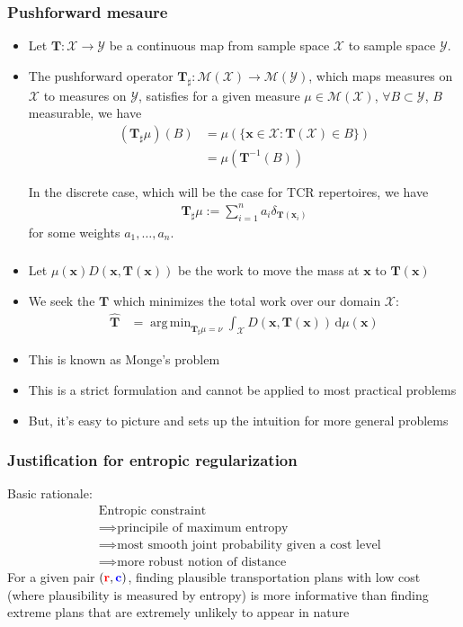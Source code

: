 \documentclass[mathserif,compress,xcolor={dvipsnames}]{beamer}
\newcommand*\ba{\[ \begin{aligned}}
\newcommand*\ea{\end{aligned} \]}
\newcommand*\estim[1]{\widehat{#1}}
\newcommand*\der{\text{d}}
\DeclareMathOperator*{\argmin}{arg\;min}
\renewcommand\;{\,}
\begin{document}
\begin{frame}\frametitle{Pushforward mesaure}
\begin{itemize}
\item
Let $\mathbf T : \mathcal X \to \mathcal Y$ be a continuous map from sample space $\mathcal X$ to sample space $\mathcal Y$.
\item
The pushforward operator $\mathbf T_\sharp : \mathcal M(\mathcal X) \to \mathcal M(\mathcal Y)$, which maps measures on $\mathcal X$ to measures on $\mathcal Y$, satisfies for a given measure $\mu \in \mathcal M(\mathcal X)$,
 $\forall B \subset \mathcal Y$, $B$ measurable, we have
\begin{align}
    \left(\mathbf T_\sharp \mu\right) (B) 
    & = \mu\left( \{ \mathbf x \in \mathcal X : \mathbf T(\mathcal X) \in B \} \right) \\
    & = \mu\left(\mathbf T^{-1}(B) \right)
\end{align}

In the discrete case, which will be the case for TCR repertoires, we have
\ba
    \mathbf T_\sharp \mu := \sum_{i=1}^n a_i \delta_{\mathbf T(\mathbf x_i)}
\ea
for some weights $a_1, \dotsc, a_n$. 
\end{itemize}
\end{frame}

\begin{frame}\frametitle{}
\begin{itemize}
\item
Let $\mu(\mathbf x) D(\mathbf x, \mathbf T(\mathbf x))$ be the work to move the mass at $\mathbf x$ to $\mathbf T(\mathbf x)$
\item
We seek the $\mathbf T$ which minimizes the total work over our domain $\mathcal X$:
\ba
\estim{\mathbf T }
	& = \argmin_{\mathbf T_\sharp\mu = \nu} \int_{\mathcal X} D(\mathbf x, \mathbf T(\mathbf x)) \;\der \mu(\mathbf x)
\ea
\item
This is known as Monge's problem
\item
This is a strict formulation and cannot be applied to most practical problems
\item
But, it's easy to picture and sets up the intuition for more general problems
\end{itemize}
\end{frame}


\begin{frame}\frametitle{Justification for entropic regularization}
Basic rationale:
\begin{align*}
\; & \text{Entropic constraint} \\
& \implies \text{principile of maximum entropy} \\
& \implies \text{most smooth joint probability given a cost level} \\
& \implies \text{more robust notion of distance}
\end{align*}
For a given pair $({\color{red} \mathbf r}, {\color{blue} \mathbf c})$, finding plausible transportation plans with low cost (where plausibility
is measured by entropy) is more informative than finding extreme plans that are
extremely unlikely to appear in nature
\end{frame}
\end{document}
